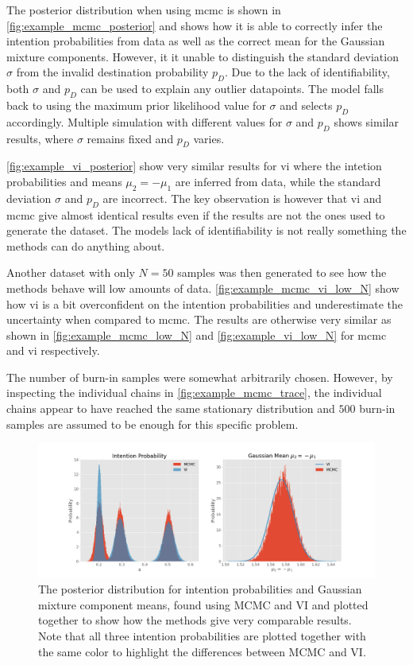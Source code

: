 The posterior distribution when using \acrshort{mcmc} is shown in \cref{fig:example_mcmc_posterior} and shows how it is able to correctly infer the intention probabilities from data as well as the correct mean for the Gaussian mixture components. However, it it unable to distinguish the standard deviation $\sigma$ from the invalid destination probability $p_D$. Due to the lack of identifiability, both $\sigma$ and $p_D$ can be used to explain any outlier datapoints. The model falls back to using the maximum prior likelihood value for $\sigma$ and selects $p_D$ accordingly. Multiple simulation with different values for $\sigma$ and $p_D$ shows similar results, where $\sigma$ remains fixed and $p_D$ varies.

\cref{fig:example_vi_posterior} show very similar results for \acrshort{vi} where the intetion probabilities and means $\mu_2 = -\mu_1$ are inferred from data, while the standard deviation $\sigma$ and $p_D$ are incorrect. The key observation is however that \acrshort{vi} and \acrshort{mcmc} give almost identical results even if the results are not the ones used to generate the dataset. The models lack of identifiability is not really something the methods can do anything about.

Another dataset with only $N=50$ samples was then generated to see how the methods behave will low amounts of data. \cref{fig:example_mcmc_vi_low_N} show how \acrshort{vi} is a bit overconfident on the intention probabilities and underestimate the uncertainty when compared to \acrshort{mcmc}. The results are otherwise very similar as shown in \cref{fig:example_mcmc_low_N} and \cref{fig:example_vi_low_N} for \acrshort{mcmc} and \acrshort{vi} respectively.

The number of burn-in samples were somewhat arbitrarily chosen. However, by inspecting the individual chains in \cref{fig:example_mcmc_trace}, the individual chains appear to have reached the same stationary distribution and $500$ burn-in samples are assumed to be enough for this specific problem. 

\begin{figure}[h]
    \centering
    \includegraphics[width=\textwidth]{figures/example_vi_mcmc_comparison.png}
    \caption{The posterior distribution for intention probabilities and Gaussian mixture component means, found using MCMC and VI and plotted together to show how the methods give very comparable results. Note that all three intention probabilities are plotted together with the same color to highlight the differences between MCMC and VI. }
    \label{fig:example_mcmc_vi_alphas}
\end{figure}

